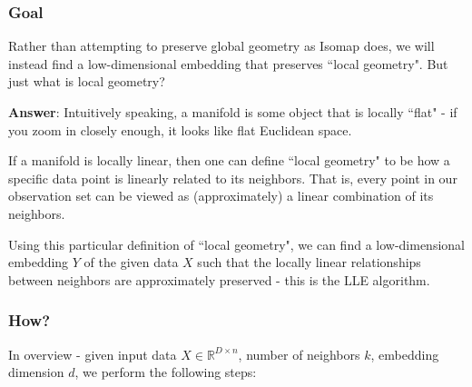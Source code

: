 \subsubsection*{Goal}
Rather than attempting to preserve global geometry as Isomap does, we will instead find a low-dimensional embedding that preserves ``local geometry". But just what is local geometry?

\noindent \textbf{Answer}: Intuitively speaking, a manifold is some object that is locally ``flat" - if you zoom in closely enough, it looks like flat Euclidean space.

If a manifold is locally linear, then one can define ``local geometry" to be how a specific data point is linearly related to its neighbors. That is, every point in our observation set can be viewed as (approximately) a linear combination of its neighbors.

Using this particular definition of ``local geometry", we can find a low-dimensional embedding $Y$ of the given data $X$ such that the locally linear relationships between neighbors are approximately preserved - this is the LLE algorithm.

\subsubsection*{How?}
In overview - given input data $X\in \mathbb{R}^{D\times n}$, number of neighbors
$k$, embedding dimension $d$, we perform the following steps:

